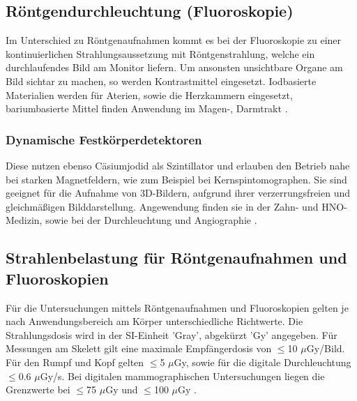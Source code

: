 
\subsection{Röntgendurchleuchtung (Fluoroskopie)}
\label{sec:Fluoroskopie}
Im Unterschied zu Röntgenaufnahmen kommt es bei der Fluoroskopie zu einer kontinuierlichen Strahlungsaussetzung mit Röntgenstrahlung,
 welche ein durchlaufendes Bild am Monitor liefern. Um ansonsten unsichtbare Organe am Bild sichtar zu machen, so werden Kontrastmittel eingesetzt.
Iodbasierte Materialien werden für Aterien, sowie die Herzkammern eingesetzt, bariumbasierte Mittel finden Anwendung im Magen-, Darmtrakt
\cite{Artikel2}.




\subsubsection{Dynamische Festkörperdetektoren}
\label{subsubsec:Festkörperdetektoren}
Diese nutzen ebenso Cäsiumjodid als Szintillator und erlauben den Betrieb nahe bei starken Magnetfeldern, wie zum Beispiel 
bei Kernspintomographen. Sie sind geeignet für die Aufnahme von 3D-Bildern, aufgrund ihrer verzerrungsfreien und gleichmäßigen
Bilddarstellung. Angewendung finden sie in der Zahn- und HNO-Medizin, sowie bei der Durchleuchtung und Angiographie 
\cite{MedizinischePhysik}.



\subsection{Strahlenbelastung für Röntgenaufnahmen und Fluoroskopien}
\label{subsec:Strahlenbelastung}

Für die Untersuchungen mittels Röntgenaufnahmen und Fluoroskopien gelten je nach Anwendungsbereich am Körper unterschiedliche 
Richtwerte. Die Strahlungsdosis wird in der SI-Einheit 'Gray', abgekürzt 'Gy' angegeben. Für Messungen am Skelett gilt eine maximale
Empfängerdosis von $\leq$10 $\mu$Gy/Bild. Für den Rumpf und Kopf gelten $\leq$5 $\mu$Gy, sowie für die digitale Durchleuchtung $\leq$0.6 
 $\mu$Gy/s. Bei digitalen mammographischen Untersuchungen liegen die Grenzwerte bei $\leq$75 $\mu$Gy und $\leq$100 $\mu$Gy \cite{Artikel}.




